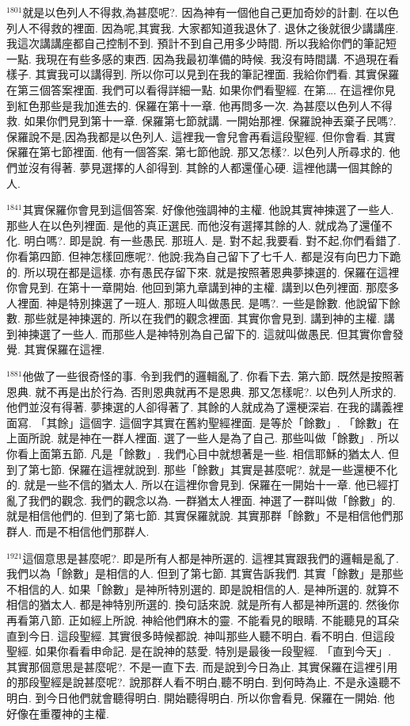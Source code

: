 \documentclass{book}
\begin{document}
$^{1801}$就是以色列人不得救,為甚麼呢?.
因為神有一個他自己更加奇妙的計劃.
在以色列人不得救的裡面.
因為呢,其實我.
大家都知道我退休了.
退休之後就很少講講座.
我這次講講座都自己控制不到.
預計不到自己用多少時間.
所以我給你們的筆記短一點.
我現在有些多感的東西.
因為我最初準備的時候.
我沒有時間講.
不過現在看樣子.
其實我可以講得到.
所以你可以見到在我的筆記裡面.
我給你們看.
其實保羅在第三個答案裡面.
我們可以看得詳細一點.
如果你們看聖經.
在第….
在這裡你見到紅色那些是我加進去的.
保羅在第十一章.
他再問多一次.
為甚麼以色列人不得救.
如果你們見到第十一章.
保羅第七節就講.
一開始那裡.
保羅說神丟棄子民嗎?.
保羅說不是,因為我都是以色列人.
這裡我一會兒會再看這段聖經.
但你會看.
其實保羅在第七節裡面.
他有一個答案.
第七節他說.
那又怎樣?.
以色列人所尋求的.
他們並沒有得著.
夢見選擇的人卻得到.
其餘的人都還僅心硬.
這裡他講一個其餘的人.

$^{1841}$其實保羅你會見到這個答案.
好像他強調神的主權.
他說其實神揀選了一些人.
那些人在以色列裡面.
是他的真正選民.
而他沒有選擇其餘的人.
就成為了還僅不化.
明白嗎?.
即是說.
有一些愚民.
那班人.
是.
對不起,我要看.
對不起,你們看錯了.
你看第四節.
但神怎樣回應呢?.
他說:我為自己留下了七千人.
都是沒有向巴力下跪的.
所以現在都是這樣.
亦有愚民存留下來.
就是按照著恩典夢揀選的.
保羅在這裡你會見到.
在第十一章開始.
他回到第九章講到神的主權.
講到以色列裡面.
那麼多人裡面.
神是特別揀選了一班人.
那班人叫做愚民.
是嗎?.
一些是餘數.
他說留下餘數.
那些就是神揀選的.
所以在我們的觀念裡面.
其實你會見到.
講到神的主權.
講到神揀選了一些人.
而那些人是神特別為自己留下的.
這就叫做愚民.
但其實你會發覺.
其實保羅在這裡.

$^{1881}$他做了一些很奇怪的事.
令到我們的邏輯亂了.
你看下去.
第六節.
既然是按照著恩典.
就不再是出於行為.
否則恩典就再不是恩典.
那又怎樣呢?.
以色列人所求的.
他們並沒有得著.
夢揀選的人卻得著了.
其餘的人就成為了還梗深岩.
在我的講義裡面寫.
「其餘」這個字.
這個字其實在舊約聖經裡面.
是等於「餘數」.
「餘數」在上面所說.
就是神在一群人裡面.
選了一些人是為了自己.
那些叫做「餘數」.
所以你看上面第五節.
凡是「餘數」.
我們心目中就想著是一些.
相信耶穌的猶太人.
但到了第七節.
保羅在這裡就說到.
那些「餘數」其實是甚麼呢?.
就是一些還梗不化的.
就是一些不信的猶太人.
所以在這裡你會見到.
保羅在一開始十一章.
他已經打亂了我們的觀念.
我們的觀念以為.
一群猶太人裡面.
神選了一群叫做「餘數」的.
就是相信他們的.
但到了第七節.
其實保羅就說.
其實那群「餘數」不是相信他們那群人.
而是不相信他們那群人.

$^{1921}$這個意思是甚麼呢?.
即是所有人都是神所選的.
這裡其實跟我們的邏輯是亂了.
我們以為「餘數」是相信的人.
但到了第七節.
其實告訴我們.
其實「餘數」是那些不相信的人.
如果「餘數」是神所特別選的.
即是說相信的人.
是神所選的.
就算不相信的猶太人.
都是神特別所選的.
換句話來說.
就是所有人都是神所選的.
然後你再看第八節.
正如經上所說.
神給他們麻木的靈.
不能看見的眼睛.
不能聽見的耳朵直到今日.
這段聖經.
其實很多時候都說.
神叫那些人聽不明白.
看不明白.
但這段聖經.
如果你看看申命記.
是在說神的慈愛.
特別是最後一段聖經.
「直到今天」.
其實那個意思是甚麼呢?.
不是一直下去.
而是說到今日為止.
其實保羅在這裡引用的那段聖經是說甚麼呢?.
說那群人看不明白,聽不明白.
到何時為止.
不是永遠聽不明白.
到今日他們就會聽得明白.
開始聽得明白.
所以你會看見.
保羅在一開始.
他好像在重覆神的主權.
\end{document}
